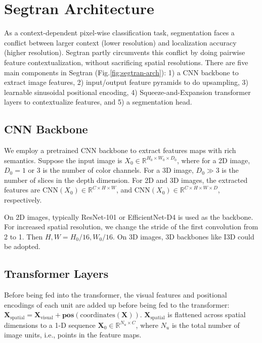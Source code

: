 \documentclass{article}
\begin{document}
\section{Segtran Architecture}
As a context-dependent pixel-wise classification task, segmentation faces a conflict between larger context (lower resolution) and localization accuracy (higher resolution). Segtran partly circumvents this conflict by doing pairwise feature contextualization, without sacrificing spatial resolutions. 
There are five main components in Segtran (Fig.\ref{fig:segtran-arch}): 1) a CNN backbone to extract image features, 2) input/output feature pyramids to do upsampling, 3) learnable sinusoidal positional encoding, 4) Squeeze-and-Expansion transformer layers to contextualize features, and 5) a segmentation head.

\subsection{CNN Backbone} \label{backbone}
We employ a pretrained CNN backbone to extract features maps with rich semantics. Suppose the input image is $X_0\in \mathbb{R}^{H_0 \times W_ 0\times D_0}$,  where for a 2D image, $D_0=1$ or 3 is the number of color channels. For a 3D image, $D_0\gg 3$ is the number of slices in the depth dimension. For 2D and 3D images, the extracted features are $\text{CNN}(X_0)\in \mathbb{R}^{C\times H \times W}$, and $\text{CNN}(X_0)\in \mathbb{R}^{C\times H \times W \times D}$, respectively.

On 2D images, typically ResNet-101 or EfficientNet-D4 is used as the backbone. For increased spatial resolution, we change the stride of the first convolution from 2 to 1. Then $H,W=H_0/16,W_0/16$. On 3D images, 3D backbones like I3D \cite{i3d} could be adopted.

\subsection{Transformer Layers}
Before being fed into the transformer, the visual features and positional encodings of each unit are added up before being fed to the transformer: $\boldsymbol{X}_{\text{spatial}}=\boldsymbol{X}_{\text{visual}} + \boldsymbol{pos}(\text{coordinates}(\boldsymbol{X}))$. 
$\boldsymbol{X}_{\text{spatial}}$ is flattened across spatial dimensions to a 1-D sequence $\boldsymbol{X}_0 \in \mathbb{R}^{N_u \times C}$, where $N_u$ is the total number of image units, i.e., points in the feature maps.
\end{document}
